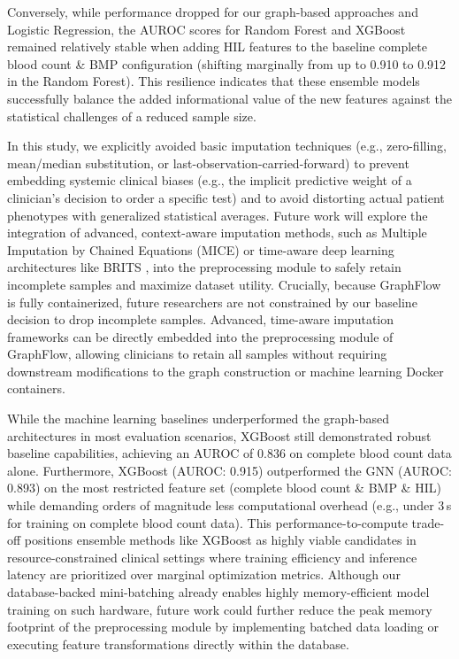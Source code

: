 \documentclass[pdflatex,sn-mathphys-num,lineno]{sn-jnl}
\theoremstyle{thmstyleone}%
\theoremstyle{thmstyletwo}%
\theoremstyle{thmstylethree}%
\begin{document}
Conversely, while performance dropped for our graph-based approaches and Logistic Regression, the AUROC scores for Random Forest and XGBoost remained relatively stable when adding HIL features to the baseline complete blood count \& BMP configuration (shifting marginally from up to 0.910 to 0.912 in the Random Forest). This resilience indicates that these ensemble models successfully balance the added informational value of the new features against the statistical challenges of a reduced sample size. 

In this study, we explicitly avoided basic imputation techniques (e.g., zero-filling, mean/median substitution, or last-observation-carried-forward) to prevent embedding systemic clinical biases (e.g., the implicit predictive weight of a clinician's decision to order a specific test) and to avoid distorting actual patient phenotypes with generalized statistical averages. Future work will explore the integration of advanced, context-aware imputation methods, such as Multiple Imputation by Chained Equations (MICE) \cite{Azur2011} or time-aware deep learning architectures like BRITS \cite{BRITS}, into the preprocessing module to safely retain incomplete samples and maximize dataset utility. Crucially, because GraphFlow is fully containerized, future researchers are not constrained by our baseline decision to drop incomplete samples. Advanced, time-aware imputation frameworks can be directly embedded into the preprocessing module of GraphFlow, allowing clinicians to retain all samples without requiring downstream modifications to the graph construction or machine learning Docker containers.

While the machine learning baselines underperformed the graph-based architectures in most evaluation scenarios, XGBoost still demonstrated robust baseline capabilities, achieving an AUROC of 0.836 on complete blood count data alone. Furthermore, XGBoost (AUROC: 0.915) outperformed the GNN (AUROC: 0.893) on the most restricted feature set (complete blood count \& BMP \& HIL) while demanding orders of magnitude less computational overhead (e.g., under 3\,s for training on complete blood count data). This performance-to-compute trade-off positions ensemble methods like XGBoost as highly viable candidates in resource-constrained clinical settings where training efficiency and inference latency are prioritized over marginal optimization metrics. Although our database-backed mini-batching already enables highly memory-efficient model training on such hardware, future work could further reduce the peak memory footprint of the preprocessing module by implementing batched data loading or executing feature transformations directly within the database.
\end{document}
